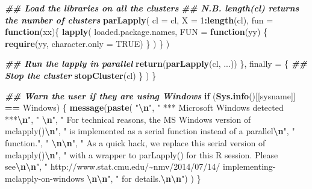 \documentclass[
  12pt,
  american,
  a4paper,
  extrafontsizes,onecolumn,openright
  ]{memoir}
\newenvironment{Shaded}{\begin{snugshade}}{\end{snugshade}}
\newcommand{\AttributeTok}[1]{\textcolor[rgb]{0.13,0.29,0.53}{#1}}
\newcommand{\ConstantTok}[1]{\textcolor[rgb]{0.56,0.35,0.01}{#1}}
\newcommand{\ControlFlowTok}[1]{\textcolor[rgb]{0.13,0.29,0.53}{\textbf{#1}}}
\newcommand{\DecValTok}[1]{\textcolor[rgb]{0.00,0.00,0.81}{#1}}
\newcommand{\DocumentationTok}[1]{\textcolor[rgb]{0.56,0.35,0.01}{\textbf{\textit{#1}}}}
\newcommand{\FunctionTok}[1]{\textcolor[rgb]{0.13,0.29,0.53}{\textbf{#1}}}
\newcommand{\NormalTok}[1]{#1}
\newcommand{\SpecialCharTok}[1]{\textcolor[rgb]{0.81,0.36,0.00}{\textbf{#1}}}
\newcommand{\StringTok}[1]{\textcolor[rgb]{0.31,0.60,0.02}{#1}}
\begin{document}
\begin{Shaded}
\begin{Highlighting}[]
      \DocumentationTok{\#\# Load the libraries on all the clusters}
      \DocumentationTok{\#\# N.B. length(cl) returns the number of clusters}
      \FunctionTok{parLapply}\NormalTok{(}
        \AttributeTok{cl =}\NormalTok{ cl, }
        \AttributeTok{X =} \DecValTok{1}\SpecialCharTok{:}\FunctionTok{length}\NormalTok{(cl), }
        \AttributeTok{fun =} \ControlFlowTok{function}\NormalTok{(xx)\{}
          \FunctionTok{lapply}\NormalTok{(}
\NormalTok{            loaded.package.names, }
            \AttributeTok{FUN =} \ControlFlowTok{function}\NormalTok{(yy) \{}
              \FunctionTok{require}\NormalTok{(yy, }\AttributeTok{character.only =} \ConstantTok{TRUE}\NormalTok{)}
\NormalTok{            \}}
\NormalTok{          )}
\NormalTok{        \}}
\NormalTok{      )}
      
      \DocumentationTok{\#\# Run the lapply in parallel }
      \FunctionTok{return}\NormalTok{(}\FunctionTok{parLapply}\NormalTok{(cl, ...))}
\NormalTok{    \}, }
    \AttributeTok{finally =}\NormalTok{ \{        }
      \DocumentationTok{\#\# Stop the cluster}
      \FunctionTok{stopCluster}\NormalTok{(cl)}
\NormalTok{    \}}
\NormalTok{  )}
\NormalTok{\}}

\DocumentationTok{\#\# Warn the user if they are using Windows}
\ControlFlowTok{if}\NormalTok{ (}\FunctionTok{Sys.info}\NormalTok{()[[}\StringTok{\textquotesingle{}sysname\textquotesingle{}}\NormalTok{]] }\SpecialCharTok{==} \StringTok{\textquotesingle{}Windows\textquotesingle{}}\NormalTok{) \{}
  \FunctionTok{message}\NormalTok{(}\FunctionTok{paste}\NormalTok{(}
    \StringTok{"}\SpecialCharTok{\textbackslash{}n}\StringTok{"}\NormalTok{, }
    \StringTok{"   *** Microsoft Windows detected ***}\SpecialCharTok{\textbackslash{}n}\StringTok{"}\NormalTok{,}
    \StringTok{"   }\SpecialCharTok{\textbackslash{}n}\StringTok{"}\NormalTok{,}
    \StringTok{"   For technical reasons, the MS Windows version of mclapply()}\SpecialCharTok{\textbackslash{}n}\StringTok{"}\NormalTok{,}
    \StringTok{"   is implemented as a serial function instead of a parallel}\SpecialCharTok{\textbackslash{}n}\StringTok{"}\NormalTok{,}
    \StringTok{"   function."}\NormalTok{,}
    \StringTok{"   }\SpecialCharTok{\textbackslash{}n\textbackslash{}n}\StringTok{"}\NormalTok{,}
    \StringTok{"   As a quick hack, we replace this serial version of mclapply()}\SpecialCharTok{\textbackslash{}n}\StringTok{"}\NormalTok{,}
    \StringTok{"   with a wrapper to parLapply() for this R session. Please see}\SpecialCharTok{\textbackslash{}n\textbackslash{}n}\StringTok{"}\NormalTok{,}
    \StringTok{"     http://www.stat.cmu.edu/\textasciitilde{}nmv/2014/07/14/}
\StringTok{    implementing{-}mclapply{-}on{-}windows }\SpecialCharTok{\textbackslash{}n\textbackslash{}n}\StringTok{"}\NormalTok{,}
    \StringTok{"   for details.}\SpecialCharTok{\textbackslash{}n\textbackslash{}n}\StringTok{"}\NormalTok{)}
\NormalTok{  )}
\NormalTok{\}}


\end{Highlighting}
\end{Shaded}
\end{document}
